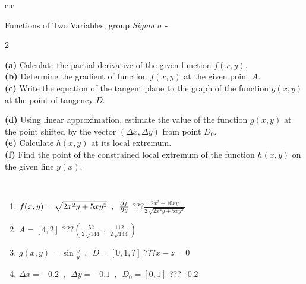 \documentclass[10pt]{report}
\begin{document}
\begin{tabular}{c:c}
\begin{minipage}[c][104.5mm][t]{0.5\linewidth}
\begin{center}
\vspace{7mm}
{\huge \LARGE Functions of Two Variables, group \textit{Sigma $\sigma$} -}\\[5mm]
\begin{minipage}{0.95\linewidth}
\begin{center}
{\small \begin{multicols}{2} \raggedright
\textbf{(a)} Calculate the partial derivative of the given function \(f(x,y)\). \\[1mm]
\textbf{(b)} Determine the gradient of function \(f(x,y)\) at the given point \(A\). \\[1mm]
\textbf{(c)} Write the equation of the tangent plane to the graph of the function \(g(x,y)\) at the point of tangency \(D\). \par \columnbreak
\textbf{(d)} Using linear approximation, estimate the value of the function \(g(x,y)\) at the point shifted by the vector \((\Delta x, \Delta y)\) from point \(D_0\). \\[1mm]
\textbf{(e)} Calculate \(h(x,y)\) at its local extremum. \\[1mm]
\textbf{(f)} Find the point of the constrained local extremum of the function \(h(x,y)\) on the given line \(y(x)\). \\[1mm]
\end{multicols}
}
\end{center}
\end{minipage}
\\[4mm]
\begin{minipage}{0.79\linewidth}
\begin{center}
\begin{varwidth}{\linewidth}
\begin{enumerate}
\normalsizerr
\item $f(x,y) = \sqrt{2x^2y + 5xy^2}\enspace , \enspace \pdv{f}{y}$\quad \dotfill\; ???\;\dotfill \quad $\frac{2x^2+10xy}{2\,\sqrt{2x^2y+5xy^2}}$
\item $A = [4, 2]$\quad \dotfill\; ???\;\dotfill \quad $\left( \frac{52}{2\,\sqrt{144}} \;,\; \frac{112}{2\,\sqrt{144}} \right)$
\item $g(x,y) = \sin\frac{x}{y} \enspace , \enspace D = [0, 1, ?]$\quad \dotfill\; ???\;\dotfill \quad $x-z=0$
\item $\Delta x = {-0.2} \enspace,\enspace \Delta y = {-0.1} \enspace,\enspace D_0 = [0,1]$\quad \dotfill\; ???\;\dotfill \quad $-0.2$

\end{enumerate}
\end{varwidth}
\end{center}
\end{minipage}
\end{center}
\end{minipage}
\end{tabular}
\end{document}
